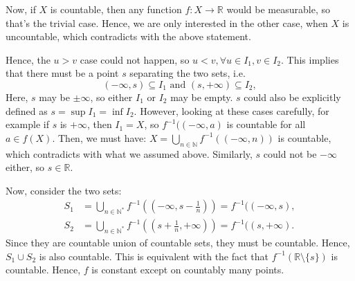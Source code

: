 \begin{enumerate}[label=\textbf{2B.\arabic*}]
  Now, if \( X \) is countable, then any function \( f: X \to
  \mathbb{R}\) would be measurable, so that's the trivial case. Hence, we are
  only interested in the other case, when \( X \) is uncountable, which
  contradicts with the above statement.

  Hence, the \( u > v \) case could not happen, so \( u < v, \forall u \in
  I_{1}, v \in I_{2} \). This implies that there must be a point \( s \)
  separating the two sets, i.e.
  \[
    (-\infty, s) \subseteq I_{1} \text{ and } (s, +\infty) \subseteq I_{2}
  ,\] Here, \( s \) may be \( \pm \infty \), so either \( I_{1} \) or \( I_{2}
  \) may be empty. \( s \) could also be explicitly defined as \( s = \sup I_{1} =
  \inf I_{2} \). However, looking at these cases carefully, for example if \(
  s \) is \( +\infty \), then \( I_{1} = X \), so \( f^{-1}((-\infty, a) \) is
  countable for all \( a \in f(X) \). Then, we must have:
\( X = \bigcup_{n \in \mathbb{N}} f^{-1}((-\infty, n)) \) is countable, which
  contradicts with what we assumed above. Similarly, \( s \) could not be \(
  -\infty \) either, so \( s \in \mathbb{R} \).

  Now, consider the two sets:
  \begin{align*}
    S_{1} &= \bigcup_{n \in \mathbb{N}^{*}} f^{-1} \left( \left( -\infty, s -
    \frac{1}{n} \right)  \right) = f^{-1}((-\infty, s) ,\\
        S_{2} &= \bigcup_{n \in \mathbb{N}^{*}} f^{-1} \left( \left( s +
        \frac{1}{n}, +\infty \right)  \right)  = f^{-1}((s, +\infty)
  .\end{align*}
  Since they are countable union of countable sets, they must be countable.
  Hence, \( S_{1} \cup  S_{2} \) is also countable. This is equivalent with the
  fact that \( f^{-1}(\mathbb{R} \setminus \{s\}  ) \) is countable. Hence, \( f
  \) is constant except on countably many points.


\end{enumerate}
